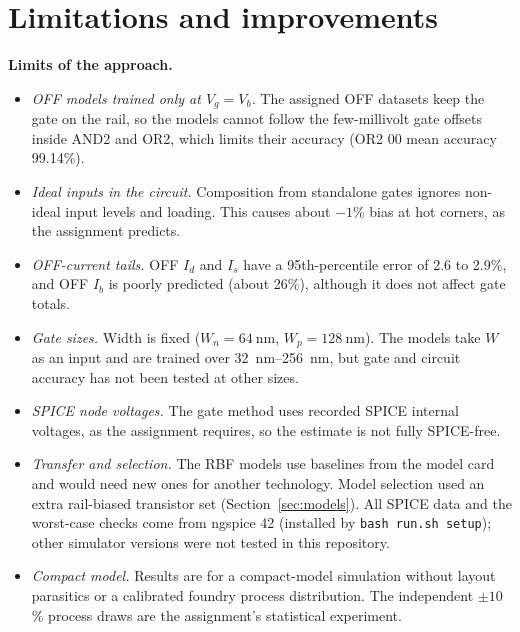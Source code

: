 \section{Limitations and improvements}
\label{sec:lim}

\textbf{Limits of the approach.}
\begin{itemize}
\item \emph{OFF models trained only at $V_g=V_b$.} The assigned OFF datasets keep the gate on the rail, so the models cannot follow the few-millivolt gate offsets inside AND2 and OR2, which limits their accuracy (OR2 00 mean accuracy 99.14\%).
\item \emph{Ideal inputs in the circuit.} Composition from standalone gates ignores non-ideal input levels and loading. This causes about $-1$\% bias at hot corners, as the assignment predicts.
\item \emph{OFF-current tails.} OFF $I_d$ and $I_s$ have a 95th-percentile error of 2.6 to 2.9\%, and OFF $I_b$ is poorly predicted (about 26\%), although it does not affect gate totals.
\item \emph{Gate sizes.} Width is fixed ($W_n=\SI{64}{\nano\meter}$, $W_p=\SI{128}{\nano\meter}$). The models take $W$ as an input and are trained over \SIrange{32}{256}{\nano\meter}, but gate and circuit accuracy has not been tested at other sizes.
\item \emph{SPICE node voltages.} The gate method uses recorded SPICE internal voltages, as the assignment requires, so the estimate is not fully SPICE-free.
\item \emph{Transfer and selection.} The RBF models use baselines from the model card and would need new ones for another technology. Model selection used an extra rail-biased transistor set (Section~\ref{sec:models}). All SPICE data and the worst-case checks come from ngspice 42 (installed by \texttt{bash run.sh setup}); other simulator versions were not tested in this repository.
\item \emph{Compact model.} Results are for a compact-model simulation without layout parasitics or a calibrated foundry process distribution. The independent $\pm10$\% process draws are the assignment's statistical experiment.
\end{itemize}

